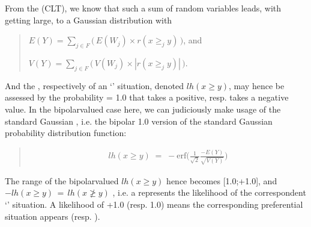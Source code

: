 \documentclass[a4paper,12pt,english]{sphinxhowto}
\begin{document}
\sphinxAtStartPar
From the  (CLT), we know that such a sum of random variables leads, with  getting large, to a Gaussian distribution  with
\begin{quote}

\sphinxAtStartPar
\(E(Y ) = \sum_{j \in F} \big(\,E(W_j) \times r(x \geq_j y)\,\big)\), and

\sphinxAtStartPar
\(V(Y) = \sum_{j \in F} \big(\,V(W_j)\times |r(x \geq_j y)|\,\big)\).
\end{quote}

\sphinxAtStartPar
And the , respectively  of an ‘’ situation, denoted \(lh(x \geq y)\),  may hence be assessed by the probability  = 1.0 \sphinxhyphen{}  that  takes a positive, resp.  takes a negative value. In the bipolar\sphinxhyphen{}valued case here, we can judiciously make usage of the standard Gaussian  , i.e. the bipolar  \sphinxhyphen{} 1.0 version of the standard Gaussian  probability distribution function:
\begin{quote}
\begin{equation*}
\begin{split}lh(x \geq y) \;=\; -\text{erf}\big(\frac{1}{\sqrt{2}}\frac{-E(Y)}{\sqrt{V(Y)}} \big)\end{split}
\end{equation*}\end{quote}

\sphinxAtStartPar
The range of the bipolar\sphinxhyphen{}valued \(lh(x \geq y)\) hence becomes {[}\sphinxhyphen{}1.0;+1.0{]}, and \(-lh(x \geq y) \,=\, lh(x \not\geq y)\) , i.e. a  represents the likelihood of the correspondent  ‘’ situation. A likelihood of +1.0 (resp. \sphinxhyphen{}1.0) means the corresponding preferential situation appears  (resp. ).

\sphinxAtStartPar
{}
\end{document}
